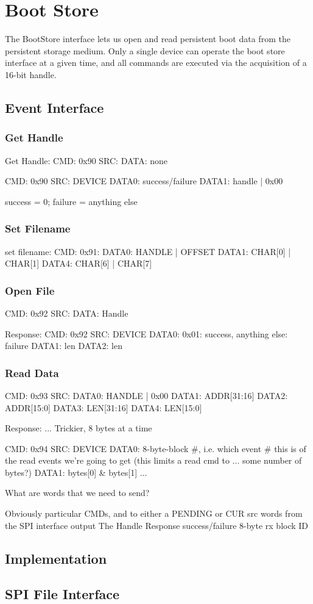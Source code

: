 \section{Boot Store}

The BootStore interface lets us open and read persistent boot data
from the persistent storage medium. Only a single device can operate
the boot store interface at a given time, and all commands are
executed via the acquisition of a 16-bit handle.

\subsection{Event Interface}
\subsubsection{Get Handle}

Get Handle: 
CMD: 0x90
SRC: 
DATA: none

\response
CMD: 0x90
SRC: DEVICE
DATA0: success/failure
DATA1: handle | 0x00

success = 0; failure = anything else

\subsubsection{Set Filename}
set filename: 
CMD: 0x91:
DATA0: HANDLE | OFFSET
DATA1:  CHAR[0] | CHAR[1]
DATA4:  CHAR[6] | CHAR[7]


\subsubsection{Open File} 
CMD: 0x92
SRC: 
DATA: Handle

Response: 
CMD: 0x92
SRC: DEVICE
DATA0: 0x01: success, anything else: failure
DATA1: len
DATA2: len

\subsubsection{Read Data}

CMD: 0x93
SRC: 
DATA0: HANDLE | 0x00
DATA1: ADDR[31:16]
DATA2: ADDR[15:0]
DATA3: LEN[31:16]
DATA4: LEN[15:0]

Response: ... Trickier, 8 bytes at a time

 
CMD: 0x94
SRC: DEVICE
DATA0: 8-byte-block #, i.e. which event # this is of the read events we're going to get (this limits a read cmd to ... some number of bytes?)
DATA1: bytes[0] & bytes[1]
...

What are words that we need to send? 

Obviously particular CMDs, and to either a PENDING or CUR src
words from the SPI interface output
The Handle
Response success/failure
8-byte rx block ID

\subsection{Implementation}

\subsection{SPI File Interface}
